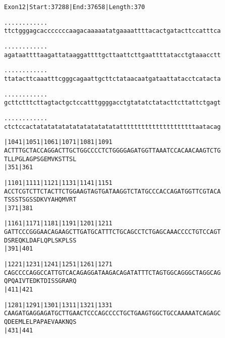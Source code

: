 \documentclass{article}
\begin{document}
\newpage
\begin{alltt}
Exon 12 | Start: 37288 | End: 37658 | Length: 370

.    .    .    .    .    .    .    .    .    .    .    .    
ttctgggagcacccccccaagacaaaaatatgaaaattttacactgatacttccatttca

.    .    .    .    .    .    .    .    .    .    .    .    
agataattttaagattataaggattttgcttaattcttgaattttatacctgtaaacctt

.    .    .    .    .    .    .    .    .    .    .    .    
ttatacttcaaatttcgggcagaattgcttctataacaatgataattatacctcatacta

.    .    .    .    .    .    .    .    .    .    .    .    
gcttctttcttagtactgctccatttggggacctgtatatctatacttcttattctgagt

.    .    .    .    .    .    .    .    .    .    .    .    
ctctccactatatatatatatatatatatatatttttttttttttttttttttaatacag

  |1041     |1051     |1061     |1071     |1081     |1091   
ACTTTGCTACCAGGACTTGCTGGCCCCTCTGGGGAGATGGTTAAATCCACAACAAGTCTG
T  L  L  P  G  L  A  G  P  S  G  E  M  V  K  S  T  T  S  L  
            |351                          |361              

  |1101     |1111     |1121     |1131     |1141     |1151   
ACCTCGTCTTCTACTTCTGGAAGTAGTGATAAGGTCTATGCCCACCAGATGGTTCGTACA
T  S  S  S  T  S  G  S  S  D  K  V  Y  A  H  Q  M  V  R  T  
            |371                          |381              

  |1161     |1171     |1181     |1191     |1201     |1211   
GATTCCCGGGAACAGAAGCTTGATGCATTTCTGCAGCCTCTGAGCAAACCCCTGTCCAGT
D  S  R  E  Q  K  L  D  A  F  L  Q  P  L  S  K  P  L  S  S  
            |391                          |401              

  |1221     |1231     |1241     |1251     |1261     |1271   
CAGCCCCAGGCCATTGTCACAGAGGATAAGACAGATATTTCTAGTGGCAGGGCTAGGCAG
Q  P  Q  A  I  V  T  E  D  K  T  D  I  S  S  G  R  A  R  Q  
            |411                          |421              

  |1281     |1291     |1301     |1311     |1321     |1331   
CAAGATGAGGAGATGCTTGAACTCCCAGCCCCTGCTGAAGTGGCTGCCAAAAATCAGAGC
Q  D  E  E  M  L  E  L  P  A  P  A  E  V  A  A  K  N  Q  S  
            |431                          |441              

\end{alltt}
\newpage
\end{document}
